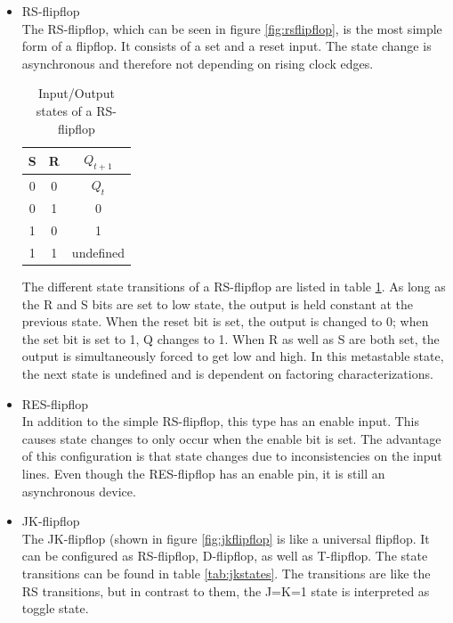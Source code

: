 \begin{itemize}
\item RS-flipflop\\
The RS-flipflop, which can be seen in figure \ref{fig:rsflipflop}, is the most simple form of a flipflop. It consists of a set and a reset input. The state change is asynchronous and therefore not depending on rising clock edges. 

\begin{table}
\begin{center}
\begin{tabular}{|c|c||c|}
\hline
S &  R & $Q_{t+1}$\\
\hline\hline
0 & 0 & $Q_{t}$\\
\hline
0 & 1 & 0\\
\hline
1 & 0 & 1\\
\hline
1 & 1 & undefined\\
\hline
\end{tabular}
\caption{Input/Output states of a RS-flipflop}
\label{tab:rsstates}
\end{center}
\end{table}

The different state transitions of a RS-flipflop are listed in table \ref{tab:rsstates}. As long as the R and S bits are set to low state, the output is held constant at the previous state. When the reset bit is set, the output is changed to 0; when the set bit is set to 1, Q changes to 1. When R as well as S are both set, the output is simultaneously forced to get low and high. In this metastable state, the next state is undefined and is dependent on factoring characterizations.

\item RES-flipflop\\
In addition to the simple RS-flipflop, this type has an enable input. This causes state changes to only occur when the enable bit is set. The advantage of this configuration is that state changes due to inconsistencies on the input lines. Even though the RES-flipflop has an enable pin, it is still an asynchronous device.
\item JK-flipflop\\
The JK-flipflop (shown in figure \ref{fig:jkflipflop} is like a universal flipflop. It can be configured as RS-flipflop, D-flipflop, as well as T-flipflop. The state transitions can be found in table \ref{tab:jkstates}. The transitions are like the RS transitions, but in contrast to them, the J=K=1 state is interpreted as toggle state.


\end{itemize}
